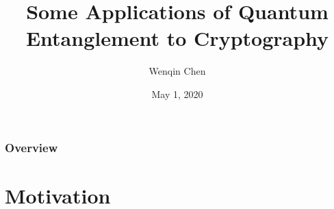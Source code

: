 \documentclass[handout, 10 pt]{beamer}
\title{Some Applications of Quantum Entanglement to Cryptography} %
\author{Wenqin Chen} %
\institute[Smith College] %
{\normalsize{Smith College}\\ %
\smallskip
Thesis Advisors: Dr. David Meyer, Prof. Rajan Mehta
}
\date{May 1, 2020} %
\begin{document}
\begin{frame}
\titlepage %
\end{frame}

\begin{frame}
\frametitle{Overview} %
\tableofcontents %
\end{frame}




\section{Motivation}
\begin{comment}
In the classical world, an electron is either in an excited state or ground state. in quantum, it's simultaneously in two states subject to some probability distribution. but when i observe it, it collapse to one or another one. then talk about the cat。

The Austrian physicist Erwin Schrödinger proposed this thought experiment involving a cat in a sealed box, with a device of a 50\% chance of killing the cat in the next hour. In the classical world, the cat is either alive or dead after 1 hour. However, in the quantum physics, at the instance before the box was open, the cat is equally alive and dead at the same time. it's only when the box is open, we see a single definite state.

The atoms form a world of possibilities rather than one of definite things or facts.
\end{comment}
\end{document}
